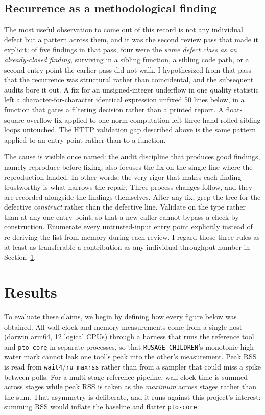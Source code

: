 \documentclass[10pt,twocolumn]{article}
\begin{document}
\subsection{Recurrence as a methodological finding}

The most useful observation to come out of this record is not any individual
defect but a pattern across them, and it was the second review pass that made
it explicit: of five findings in that pass, four were the \emph{same defect
class as an already-closed finding}, surviving in a sibling function, a
sibling code path, or a second entry point the earlier pass did not walk. I
hypothesized from that pass that the recurrence was structural rather than
coincidental, and the subsequent audits bore it out. A fix for an
unsigned-integer underflow in one quality statistic left a
character-for-character identical expression unfixed 50 lines below, in a
function that gates a filtering decision rather than a printed report. A
float-square overflow fix applied to one norm computation left three
hand-rolled sibling loops untouched. The HTTP validation gap described above
is the same pattern applied to an entry point rather than to a function.

The cause is visible once named: the audit discipline that produces good
findings, namely reproduce before fixing, also focuses the fix on the single
line where the reproduction landed. In other words, the very rigor that makes
each finding trustworthy is what narrows the repair. Three process changes
follow, and they are recorded alongside the findings themselves. After any
fix, grep the tree for the defective \emph{construct} rather than the
defective line. Validate on the type rather than at any one entry point, so
that a new caller cannot bypass a check by construction. Enumerate every
untrusted-input entry point explicitly instead of re-deriving the list from
memory during each review. I regard those three rules as at least as
transferable a contribution as any individual throughput number in
Section~\ref{sec:results}.

\section{Results}
\label{sec:results}

To evaluate these claims, we begin by defining how every figure below was
obtained. All wall-clock and memory measurements come from a single host
(darwin arm64, 12 logical CPUs) through a harness that runs the reference
tool and \texttt{pto-core} in separate processes, so that
\texttt{RUSAGE\_CHILDREN}'s monotonic high-water mark cannot leak one tool's
peak into the other's measurement. Peak RSS is read from
\texttt{wait4}/\texttt{ru\_maxrss} rather than from a sampler that could miss
a spike between polls. For a multi-stage reference pipeline, wall-clock time
is summed across stages while peak RSS is taken as the \emph{maximum} across
stages rather than the sum. That asymmetry is deliberate, and it runs against
this project's interest: summing RSS would inflate the baseline and flatter
\texttt{pto-core}.
\end{document}
